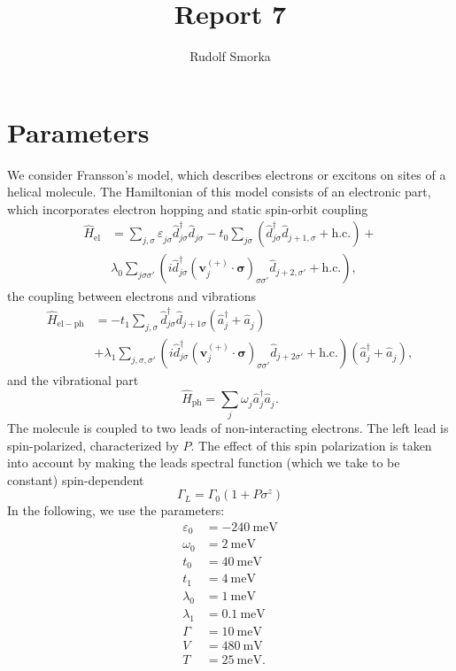 \documentclass{article}
\renewcommand{\vec}[1]{\mathbf{#1}}
\newcommand{\pdagger}{{\phantom{\dagger}}}
\begin{document}
\title{Report 7}
\author{Rudolf Smorka}
\maketitle
\section{Parameters}
We consider Fransson's model, which describes electrons or excitons on sites of a helical molecule. The Hamiltonian of this model consists of an electronic part, which incorporates electron hopping and static spin-orbit coupling 
\begin{equation}
	\begin{split}
		\hat{H}_\mathrm{el} &= \sum_{j,\sigma} \varepsilon_{j\sigma}^\pdagger \hat{d}_{j\sigma}^\dagger \hat{d}_{j\sigma}^\pdagger - t_0 \sum_{j\sigma} (\hat{d}_{j\sigma}^\dagger \hat{d}_{j+1,\sigma}^\pdagger + \mathrm{h.c.}) +\\& \lambda_0^\pdagger\sum_{j\sigma\sigma'} (i\hat{d}_{j\sigma}^\dagger (\vec{v}_j^{(+)}\cdot \bm{\sigma})_{\sigma\sigma'}^\pdagger \hat{d}_{j+2,\sigma'}^\pdagger + \mathrm{h.c.}),
	\end{split}
\end{equation}
the coupling between electrons and vibrations
\begin{align}
	\hat{H}_\mathrm{el-ph} &= - t_1^\pdagger \sum_{j,\sigma}  \hat{d}_{j\sigma}^\dagger \hat{d}_{j+1\sigma}^\pdagger (\hat{a}_{j}^\dagger + \hat{a}_{j}^\pdagger) \\ & + \lambda_1^\pdagger\sum_{j,\sigma,\sigma'} (i \hat{d}_{j\sigma}^\dagger (\vec{v}_j^{(+)} \cdot \bm{\sigma})_{\sigma\sigma'}^\pdagger \hat{d}_{j+2\sigma'}^\pdagger +\mathrm{h.c.})(\hat{a}_{j}^\dagger + \hat{a}_{j}^\pdagger),\label{eq:HelPh}
\end{align}
and the vibrational part
\begin{equation}
	\hat{H}_\mathrm{ph} = \sum_{j} \omega_{j}^\pdagger \hat{a}_{j}^\dagger \hat{a}_{j}^\pdagger.
	\label{eq:HPh} 
\end{equation}
The molecule is coupled to two leads of non-interacting electrons. The left lead is spin-polarized, characterized by $P$. The effect of this spin polarization is taken into account by making the leads spectral function (which we take to be constant) spin-dependent
\begin{equation}
	\Gamma_L= \Gamma_0 (1+P\sigma^z)
\end{equation}
In the following, we use the parameters:
\begin{align*}
	\varepsilon_0 &= -\SI{240}{\milli\electronvolt}\\
	\omega_0 &= \SI{2}{\milli\electronvolt}\\
	t_0 &= \SI{40}{\milli\electronvolt}\\
	t_1 &= \SI{4}{\milli\electronvolt}\\
	\lambda_0 &= \SI{1}{\milli\electronvolt}\\
	\lambda_1 &= \SI{0.1}{\milli\electronvolt}\\
	\Gamma &= \SI{10}{\milli\electronvolt}\\
	V 	&= \SI{480}{\milli\volt}\\
	T &= \SI{25}{\milli\electronvolt}.
\end{align*}
\end{document}
